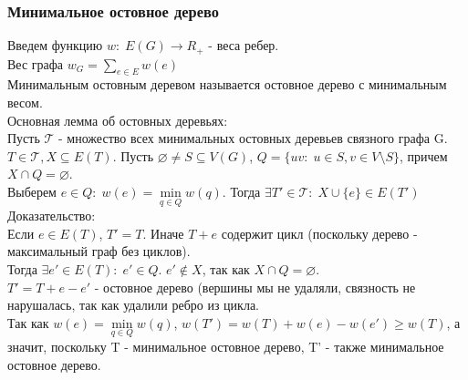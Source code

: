 \subsubsection{Минимальное остовное дерево}
Введем функцию $w: \; E(G) \rightarrow R_+$ - веса ребер.\\
Вес графа $w_G = \sum\limits_{e \in E}w(e)$\\
Минимальным остовным деревом называется остовное дерево с минимальным весом.\\
Основная лемма об остовных деревьях:\\
Пусть $\mathcal{T}$ - множество всех минимальных остовных деревьев связного графа G.\\
$T \in \mathcal{T}, X \subseteq E(T)$. Пусть $\varnothing \not= S \subseteq V(G)$, $Q = \{uv: \; u \in S, v \in V \setminus S\}$, причем $X \cap Q = \varnothing$.\\
Выберем $e \in Q: \; w(e) = \min\limits_{q \in Q}w(q)$. Тогда $\exists T' \in \mathcal{T}: \; X \cup \{e\} \in E(T')$\\
Доказательство:\\
Если $e \in E(T)$, $T' = T$. Иначе $T + e$ содержит цикл (поскольку дерево - максимальный граф без циклов).\\
Тогда $\exists e' \in E(T): \; e' \in Q$. $e' \not\in X$, так как $X \cap Q = \varnothing$.\\
$T' = T + e - e'$ - остовное дерево (вершины мы не удаляли, связность не нарушалась, так как удалили ребро из цикла.\\
Так как $w(e) = \min\limits_{q \in Q}w(q)$, $w(T') = w(T) + w(e) - w(e') \geq w(T)$, а значит, поскольку T - минимальное остовное дерево, T' - также минимальное остовное дерево.